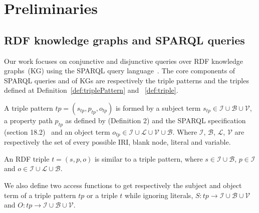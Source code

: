 \section{Preliminaries}

\subsection{RDF knowledge graphs and SPARQL queries}

Our work focuses on conjunctive and disjunctive queries over RDF knowledge graphs~(KG) using the SPARQL query language~\cite{w3SPARQLQuery}.
The core components of SPARQL queries and of KGs are respectively the triple patterns and the triples defined at Definition~\ref{def:triplePattern} and ~\ref{def:triple}.


\begin{definition}\label{def:triplePattern}
    A triple pattern $tp = (s_{tp}, p_{tp}, o_{tp})$ is formed by a subject term $s_{tp} \in \mathcal{I} \cup \mathcal{B} \cup \mathcal{V}$, 
    a property path   $p_{tp}$ as defined by  \citeauthor{Kostylev2015} (Definition 2) and the SPARQL specification (section 18.2)~\cite{w3SPARQLQuery} 
    and an object term  $o_{tp} \in \mathcal{I} \cup \mathcal{L} \cup \mathcal{V} \cup \mathcal{B}$.
    Where $\mathcal{I}$, $\mathcal{B}$, $\mathcal{L}$, $\mathcal{V}$ are respectively the set of every possible IRI, blank node, literal and variable.
\end{definition}


\begin{definition}[Triple]\label{def:triple}
    An RDF triple $t = (s,p,o)$ is similar to a triple pattern, 
    where $s \in\mathcal{I} \cup \mathcal{B}$,
    $p \in \mathcal{I}$ and $o \in \mathcal{I} \cup \mathcal{L} \cup \mathcal{B}$.
\end{definition}

We also define two access functions to get respectively the subject and object term of a triple pattern $tp$ or a triple $t$ while ignoring literals,
$ S: tp \rightarrow \mathcal{I} \cup \mathcal{B} \cup \mathcal{V}$ and $O: tp \rightarrow \mathcal{I} \cup \mathcal{B} \cup \mathcal{V}$.

